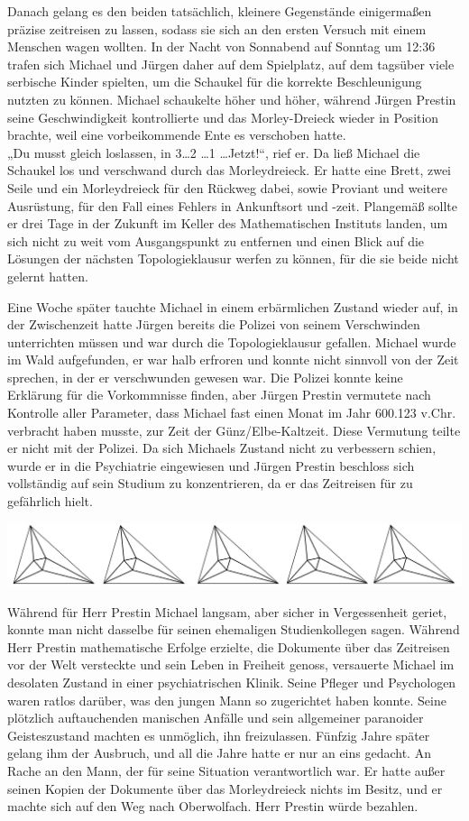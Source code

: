 \documentclass[oneside]{memoir}
\newcommand{\parasep}{
\bigskip
\bigskip
\begin{center} 
   \includegraphics[scale=.08]{parasep5.jpg} 
\end{center}
\bigskip
\bigskip
}
\begin{document}
Danach gelang es den beiden tatsächlich, kleinere Gegenstände einigermaßen präzise zeitreisen zu lassen, sodass sie sich an den ersten Versuch mit einem Menschen wagen wollten. In der Nacht von Sonnabend auf Sonntag um 12:36 trafen sich Michael und Jürgen daher auf dem Spielplatz, auf dem tagsüber viele serbische Kinder spielten, um die Schaukel für die korrekte Beschleunigung nutzten zu können. Michael schaukelte höher und höher, während Jürgen Prestin seine Geschwindigkeit kontrollierte und das Morley-Dreieck wieder in Position brachte, weil eine vorbeikommende Ente es verschoben hatte. \\
„Du musst gleich loslassen, in 3\ldots 2 \ldots 1 \ldots Jetzt!“, rief er.  Da ließ Michael die Schaukel los und verschwand durch das Morleydreieck. Er hatte eine Brett, zwei Seile und ein Morleydreieck für den Rückweg dabei, sowie Proviant und weitere Ausrüstung, für den Fall eines Fehlers in Ankunftsort und -zeit. Plangemäß sollte er drei Tage in der Zukunft im Keller des Mathematischen Instituts landen, um sich nicht zu weit vom Ausgangspunkt zu entfernen und einen Blick auf die Lösungen der nächsten Topologieklausur werfen zu können, für die sie beide nicht gelernt hatten.
 
 Eine Woche später tauchte Michael in einem erbärmlichen Zustand wieder auf, in der Zwischenzeit hatte Jürgen bereits die Polizei von seinem Verschwinden unterrichten müssen und war durch die Topologieklausur gefallen. Michael wurde im Wald aufgefunden, er war halb erfroren und konnte nicht sinnvoll von der Zeit sprechen, in der er verschwunden gewesen war. Die Polizei konnte keine Erklärung für die Vorkommnisse finden, aber Jürgen Prestin vermutete nach Kontrolle aller Parameter, dass Michael fast einen Monat im Jahr 600.123 v.Chr.  verbracht haben musste, zur Zeit der Günz/Elbe-Kaltzeit. Diese Vermutung teilte er nicht mit der Polizei. Da sich Michaels Zustand nicht zu verbessern schien, wurde er in die  Psychiatrie eingewiesen und Jürgen Prestin beschloss sich vollständig auf sein Studium zu konzentrieren, da er das Zeitreisen für zu gefährlich hielt.
 
\parasep

Während für Herr Prestin Michael langsam, aber sicher in Vergessenheit geriet, konnte man nicht dasselbe für seinen ehemaligen Studienkollegen sagen. Während Herr Prestin mathematische Erfolge erzielte, die Dokumente über das Zeitreisen vor der Welt versteckte und sein Leben in Freiheit genoss, versauerte Michael im desolaten Zustand in einer psychiatrischen Klinik. Seine Pfleger und Psychologen waren ratlos darüber, was den jungen Mann so zugerichtet haben konnte. Seine plötzlich auftauchenden manischen Anfälle und sein allgemeiner paranoider Geisteszustand machten es unmöglich, ihn freizulassen. Fünfzig Jahre später gelang ihm der Ausbruch, und all die Jahre hatte er nur an eins gedacht. An Rache an den Mann, der für seine Situation verantwortlich war. Er hatte außer seinen Kopien der Dokumente über das Morleydreieck nichts im Besitz, und er machte sich auf den Weg nach Oberwolfach. Herr Prestin würde bezahlen.
\end{document}
